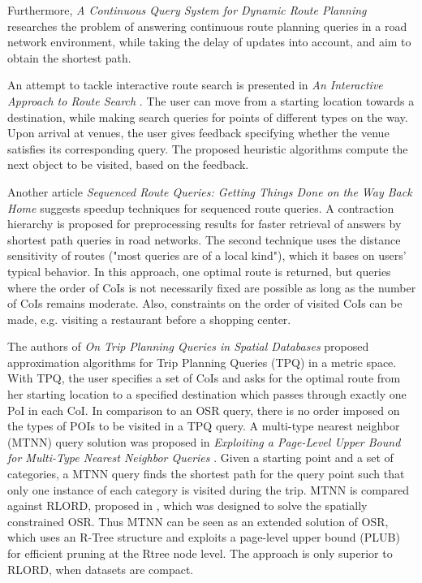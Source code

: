 Furthermore, \textit{A Continuous Query System for Dynamic Route Planning} \cite{dynamic} researches the problem of answering continuous route planning queries in a road network environment, while taking the delay of updates into account, and aim to obtain the shortest path.

An attempt to tackle interactive route search is presented in \textit{An Interactive Approach to Route Search} \cite{interactive}. The user can move from a starting location towards a destination, while making search queries for points of different types on the way. Upon arrival at venues, the user gives feedback specifying whether the venue satisfies its corresponding query. The proposed heuristic algorithms compute the next object to be visited, based on the feedback.

Another article \textit{Sequenced Route Queries: Getting Things Done on the Way Back Home} \cite{skyline} suggests speedup techniques for sequenced route queries. A contraction hierarchy is proposed for preprocessing results for faster retrieval of answers by shortest path queries in road networks. The second technique uses the distance sensitivity of routes ("most queries are of a local kind"), which it bases on users' typical behavior. In this approach, one optimal route is returned, but queries where the order of CoIs is not necessarily fixed are possible as long as the number of CoIs remains moderate. Also, constraints on the order of visited CoIs can be made, e.g. visiting a restaurant before a shopping center. 

The authors of \textit{On Trip Planning Queries in Spatial Databases} \cite{tpq} proposed approximation algorithms for Trip Planning Queries (TPQ) in a metric space. With TPQ, the user specifies a set of CoIs and asks for the optimal route from her starting location to a specified destination which passes through exactly one PoI in each CoI. In comparison to an OSR query, there is no order imposed on the types of POIs to be visited in a TPQ query. A multi-type nearest neighbor (MTNN) query solution was proposed in \textit{Exploiting a Page-Level Upper Bound for Multi-Type Nearest Neighbor Queries} \cite{mtnn}. Given a starting point and a set of categories, a MTNN query finds the shortest path for the query point such that only one instance of each category is visited during the trip. MTNN is compared against RLORD, proposed in \cite{OSR}, which was designed to solve the spatially constrained OSR. Thus MTNN can be seen as an extended solution of OSR, which uses an R-Tree structure and exploits a page-level upper bound (PLUB) for efficient pruning at the Rtree node level. The approach is only superior to RLORD, when datasets are compact.

